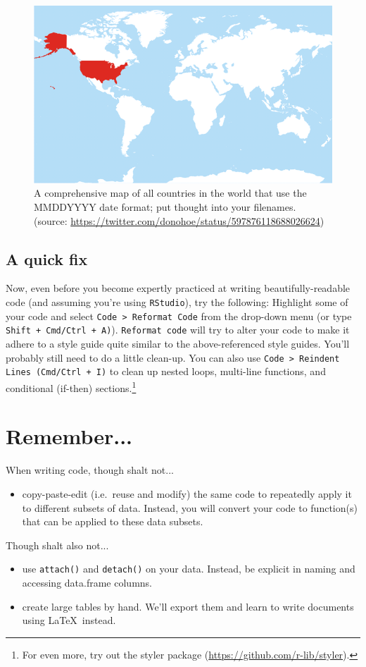 \documentclass[12pt,letterpaper]{article}
\begin{document}
\begin{figure}[H]
	\centering
	\includegraphics[width=0.6\linewidth]{figs/MapMMDDYYYY.png}
	\caption{A comprehensive map of all countries in the world that use the MMDDYYYY date format; 
	put thought into your filenames. (source: 
	\url{https://twitter.com/donohoe/status/597876118688026624})}
	\label{fig:mapMMDDYYYY}
\end{figure}


\subsection{A quick fix}
Now, even before you become expertly practiced at writing beautifully-readable code (and assuming 
you're using \texttt{RStudio}), try the following:
Highlight some of your code and select \texttt{Code > Reformat Code} from the drop-down menu (or 
type \texttt{Shift + Cmd/Ctrl + A)}).
\texttt{Reformat code} will try to alter your code to make it adhere to a style guide quite similar to the 
above-referenced style guides.
You'll probably still need to do a little clean-up.
You can also use \texttt{Code > Reindent Lines (Cmd/Ctrl + I)} to clean up nested loops, multi-line 
functions, and conditional (if-then) sections.\footnote{For even more, try out the styler package 
(\url{https://github.com/r-lib/styler}).}



\section{Remember...}

When writing code, though shalt not...

\begin{itemize}
	\item copy-paste-edit (i.e.~reuse and modify) the same code to repeatedly apply it to different 
	subsets of data.  Instead, you will convert your code to function(s) that can be applied to these 
	data subsets.
\end{itemize}
Though shalt also not...
\begin{itemize}
	\item use \texttt{attach()} and \texttt{detach()} on your data.  Instead, be explicit in naming and 
	accessing data.frame columns.
	\item create large tables by hand. We'll export them and learn to write documents using \LaTeX\ 
	instead.
\end{itemize}
\end{document}
